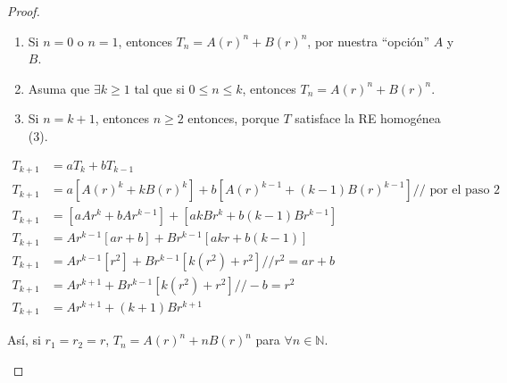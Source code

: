 \begin{proof}
\begin{enumerate}[label={Caso~\arabic*}]
\begin{enumerate}[label={Paso~\arabic*}]
	\item Si $n=0$ o $n=1$, entonces $T_{n}={A(r)}^{n}+{B(r)}^{n}$, por nuestra ``opción'' $A$ y $B$.
	\item Asuma que $\exists k\geq1$ tal que si $0\leq n\leq k$, entonces $T_{n}={A(r)}^{n}+{B(r)}^{n}$.
	\item Si $n=k+1$, entonces $n\geq2$ entonces, porque $T$ satisface la RE homogénea (3).
\end{enumerate}

\begin{align*}
	T_{k+1}&= aT_{k}+bT_{k-1}\\
	T_{k+1}&= a[A(r)^k+kB(r)^k]+b[A(r)^{k-1}+(k-1)B(r)^{k-1}] // \text{ por el paso 2}\\
	T_{k+1}&=[aAr^k+bAr^{k-1}]+[akBr^k+b(k-1)Br^{k-1}]\\
	T_{k+1}&=Ar^{k-1}[ar+b]+Br^{k-1}[akr + b(k-1)]\\
	T_{k+1}&=Ar^{k-1}[r^2]+Br^{k-1}[k(r^{2}) +r^{2}]//r^2 = ar + b\\
	T_{k+1}&=Ar^{k+1}+Br^{k-1}[k(r^2) + r^2]//-b = r^{2}\\
	T_{k+1}&=Ar^{k+1}+(k+1)Br^{k+1}
\end{align*}

Así, si $r_{1}=r_{2}=r$, $T_{n}=A(r)^{n}+nB(r)^{n}$ para $\forall n\in\mathds{N}$.
\end{enumerate}
\end{proof}